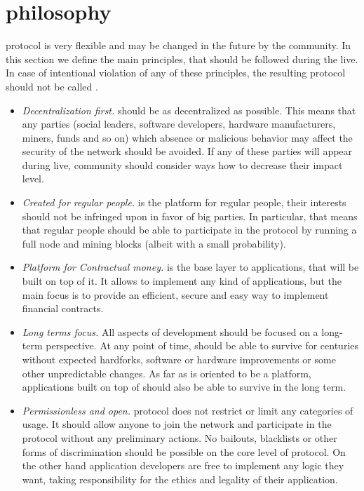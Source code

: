 \section{\Ergo{} philosophy}
\label{sec:social}

\Ergo{} protocol is very flexible and may be changed in the future by the community.
In this section we define the main principles, that should be followed during the \Ergo{} live.
In case of intentional violation of any of these principles, the resulting protocol should not
be called \Ergo{}.

\begin{itemize}
    \item{\em Decentralization first.} \Ergo{} should be as decentralized as possible.
    This means that any parties (social leaders, software developers, hardware manufacturers, miners, funds and so on)
    which absence or malicious behavior may affect the security of the network should be avoided.
    If any of these parties will appear during \Ergo{} live, community should consider ways how to decrease
    their impact level.
    \item{\em Created for regular people.} \Ergo{} is the platform for regular people, their interests should not
    be infringed upon in favor of big parties. In particular, that means that regular people should be able to
    participate in the protocol by running a full node and mining blocks (albeit with a small probability).
    \item{\em Platform for Contractual money.} \Ergo{} is the base layer to applications, that will be built
    on top of it. It allows to implement any kind of applications, but the main focus is
    to provide an efficient, secure and easy way to implement financial contracts.
    \item{\em Long terms focus.} All aspects of \Ergo{} development should be focused on a long-term perspective.
    At any point of time, \Ergo{} should be able to survive for centuries without expected hardforks,
    software or hardware improvements or some other unpredictable changes. As far as \Ergo{} is oriented
    to be a platform, applications built on top of \Ergo{} should also be able to survive in the long term.
    \item{\em Permissionless and open.} \Ergo{} protocol does not restrict or limit any categories of usage.
    It should allow anyone to join the network and participate in the protocol without any preliminary actions.
    No bailouts, blacklists or other forms of discrimination should be possible on the core level of \Ergo{} protocol.
    On the other hand application developers are free to implement any logic they want, taking responsibility
    for the ethics and legality of their application.
\end{itemize}